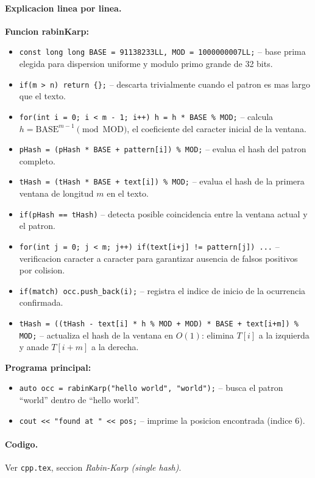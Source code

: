 \paragraph{Explicacion linea por linea.}
\textbf{Funcion rabinKarp:}
\begin{itemize}\setlength\itemsep{0pt}
	\item \verb|const long long BASE = 91138233LL, MOD = 1000000007LL;| -- base prima elegida para dispersion uniforme y modulo primo grande de 32 bits.
	\item \verb|if(m > n) return {};| -- descarta trivialmente cuando el patron es mas largo que el texto.
	\item \verb|for(int i = 0; i < m - 1; i++) h = h * BASE % MOD;| -- calcula $h = \text{BASE}^{m-1} \pmod{\text{MOD}}$, el coeficiente del caracter inicial de la ventana.
	\item \verb|pHash = (pHash * BASE + pattern[i]) % MOD;| -- evalua el hash del patron completo.
	\item \verb|tHash = (tHash * BASE + text[i]) % MOD;| -- evalua el hash de la primera ventana de longitud $m$ en el texto.
	\item \verb|if(pHash == tHash)| -- detecta posible coincidencia entre la ventana actual y el patron.
	\item \verb|for(int j = 0; j < m; j++) if(text[i+j] != pattern[j]) ...| -- verificacion caracter a caracter para garantizar ausencia de falsos positivos por colision.
	\item \verb|if(match) occ.push_back(i);| -- registra el indice de inicio de la ocurrencia confirmada.
	\item \verb|tHash = ((tHash - text[i] * h % MOD + MOD) * BASE + text[i+m]) % MOD;| -- actualiza el hash de la ventana en $O(1)$: elimina $T[i]$ a la izquierda y anade $T[i+m]$ a la derecha.
\end{itemize}
\textbf{Programa principal:}
\begin{itemize}\setlength\itemsep{0pt}
	\item \verb|auto occ = rabinKarp("hello world", "world");| -- busca el patron ``world'' dentro de ``hello world''.
	\item \verb|cout << "found at " << pos;| -- imprime la posicion encontrada (indice 6).
\end{itemize}

\paragraph{Codigo.}
Ver \texttt{cpp.tex}, seccion \textit{Rabin-Karp (single hash)}.

\vspace{0.5em}
